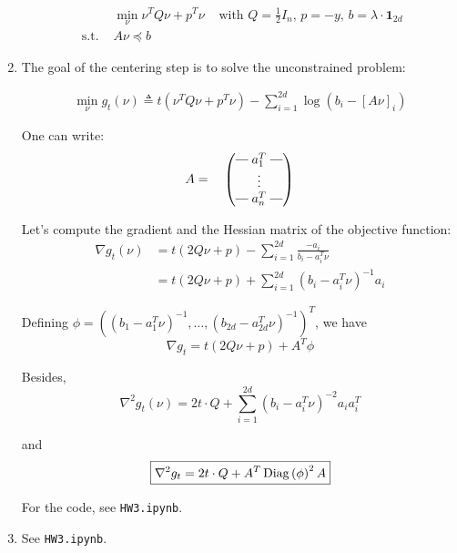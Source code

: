 \documentclass[a4paper, 11pt]{report}
\newcommand{\rotvert}{\rotatebox[origin=c]{90}{$\vert$}}
\begin{document}
\begin{enumerate}
	\begin{equation*}
		\boxed{\begin{aligned}
		& \min_{\nu} \nu^{T} Q \nu + p^{T} \nu & \text{ with } Q = \frac{1}{2} I_n,\, p = - y,\, b = \lambda \cdot \mathbf{1}_{2d} \\
		\text{ s.t. } & A \nu \preceq b
		\end{aligned}}
	\end{equation*}

	\item The goal of the centering step is to solve the unconstrained problem:
	
	\begin{equation*}
	    \begin{aligned}
	    \min_{\nu} g_{t}(\nu) \triangleq t \left( \nu^{T} Q \nu + p^{T} \nu \right) - \sum_{i=1}^{2d} \log \left( b_i - \left[ A \nu \right]_{i} \right)
	    \end{aligned}
	\end{equation*}
	
	One can write:
	\begin{equation*}
	A = \quad
        \begin{pmatrix} 
            \protect\rotvert\; a_{1}^{T} \;\protect\rotvert \\
            \vdots \\
            \protect\rotvert\; a_{n}^{T} \;\protect\rotvert
        \end{pmatrix}
    \end{equation*}
	
	Let's compute the gradient and the Hessian matrix of the objective function:
	\begin{equation*}
	    \begin{aligned}
	    \nabla g_{t} (\nu) &= t \left( 2 Q \nu + p \right) - \sum_{i=1}^{2d} \frac{- a_i}{b_i - a_i^T \nu} \\
	    &= t \left( 2 Q \nu + p \right) + \sum_{i=1}^{2d} \left( b_i - a_i^T \nu \right)^{-1} a_i
	    \end{aligned}
	\end{equation*}
	
	Defining $\phi = \left( \left( b_1 - a_1^T \nu \right)^{-1}, \dots, \left( b_{2d} - a_{2d}^T \nu \right)^{-1} \right)^T$, we have
	\begin{equation*}
	    \boxed{\nabla g_t = t \left( 2 Q \nu + p \right) + A^T \phi}
	\end{equation*}
	
	Besides,
	\begin{equation*}
	    \nabla^2 g_{t} (\nu) = 2 t \cdot Q + \sum_{i=1}^{2d} \left( b_i - a_i^T \nu \right)^{-2} a_i a_i^T
	\end{equation*}

    and
    \begin{equation*}
        \boxed{\nabla^2 g_t = 2 t \cdot Q + A^T \operatorname{Diag} \left( \phi \right)^2 A}
    \end{equation*}
    
    For the code, see \texttt{HW3.ipynb}.

    \item See \texttt{HW3.ipynb}.
\end{enumerate}
\end{document}
